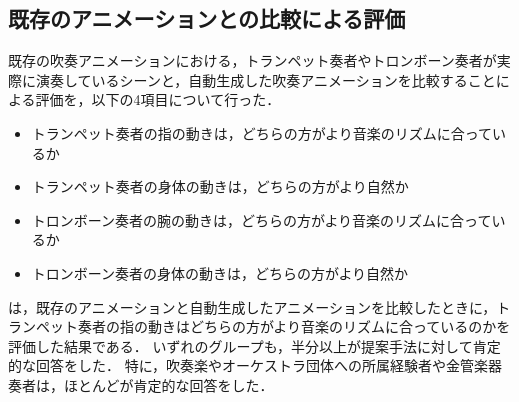 \subsection{既存のアニメーションとの比較による評価}
既存の吹奏アニメーションにおける，トランペット奏者やトロンボーン奏者が実際に演奏しているシーンと，自動生成した吹奏アニメーションを比較することによる評価を，以下の4項目について行った．
\begin{itemize}
	\item トランペット奏者の指の動きは，どちらの方がより音楽のリズムに合っているか
	\item トランペット奏者の身体の動きは，どちらの方がより自然か
	\item トロンボーン奏者の腕の動きは，どちらの方がより音楽のリズムに合っているか
	\item トロンボーン奏者の身体の動きは，どちらの方がより自然か
\end{itemize}
\vspace{5mm}
\par
{}は，既存のアニメーションと自動生成したアニメーションを比較したときに，トランペット奏者の指の動きはどちらの方がより音楽のリズムに合っているのかを評価した結果である．
いずれのグループも，半分以上が提案手法に対して肯定的な回答をした．
特に，吹奏楽やオーケストラ団体への所属経験者や金管楽器奏者は，ほとんどが肯定的な回答をした．
